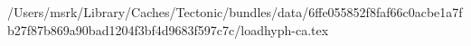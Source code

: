 /Users/msrk/Library/Caches/Tectonic/bundles/data/6ffe055852f8faf66c0acbe1a7fb27f87b869a90bad1204f3bf4d9683f597c7c/loadhyph-ca.tex